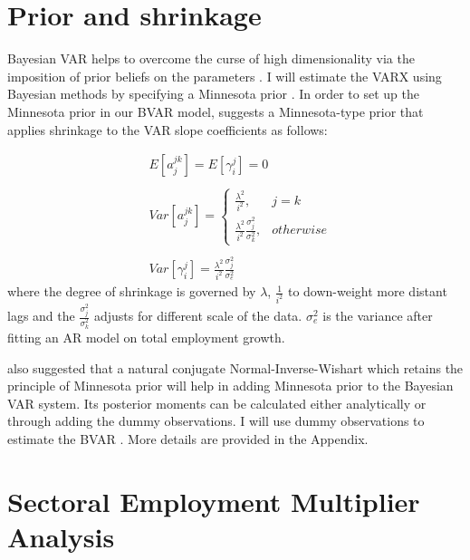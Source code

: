 \documentclass{monashthesis}
\begin{document}
\hypertarget{prior-and-shrinkage}{%
\section{Prior and shrinkage}\label{prior-and-shrinkage}}

Bayesian VAR helps to overcome the curse of high dimensionality via the imposition of prior beliefs on the parameters \autocite{banbura2010large}. I will estimate the VARX using Bayesian methods by specifying a Minnesota prior \autocites[e.g.][]{anderson2020,litterman1986,robertson1999vector}. In order to set up the Minnesota prior in our BVAR model, \textcite{banbura2010large} suggests a Minnesota-type prior that applies shrinkage to the VAR slope coefficients as follows:

\[
\begin{aligned}\label{eq:1}
&E[a_{j}^{jk}] = E[\gamma_{i}^j]=0\\
\\
&Var[a_j^{jk}]= 
\begin{cases}
\frac{\lambda^2}{i^2},&j=k\\
\frac{\lambda^2}{i^2}\frac{\sigma^2_{j}}{\sigma^2_k},& otherwise
\end{cases}\\
\\
&Var[\gamma_i^{j}]=\frac{\lambda^2}{i^2}\frac{\sigma^2_{j}}{\sigma^2_e}
\end{aligned}
\]
where the degree of shrinkage is governed by \(\lambda\), \(\frac{1}{i^2}\) to down-weight more distant lags and the \(\frac{\sigma_j^2}{\sigma_k^2}\) adjusts for different scale of the data. \(\sigma^2_e\) is the variance after fitting an AR model on total employment growth.

\textcite{banbura2010large} also suggested that a natural conjugate Normal-Inverse-Wishart which retains the principle of Minnesota prior will help in adding Minnesota prior to the Bayesian VAR system. Its posterior moments can be calculated either analytically or through adding the dummy observations. I will use dummy observations to estimate the BVAR \autocites[e.g.][]{banbura2010large,anderson2020,wozniak2016bayesian}. More details are provided in the Appendix.

\hypertarget{sectoral-employment-multiplier-analysis}{%
\section{Sectoral Employment Multiplier Analysis}\label{sectoral-employment-multiplier-analysis}}
\end{document}
